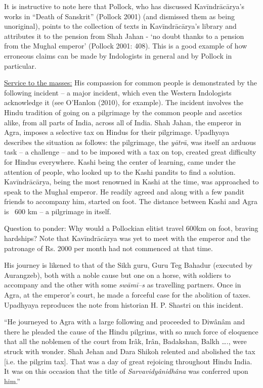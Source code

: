 \begin{enumerate}
 It is instructive to note here that Pollock, who has discussed Kavīndrācārya’s works in “Death of Sanskrit” (Pollock 2001) (and dismissed them as being unoriginal), points to the collection of texts in Kavīndrācārya’s library and attributes it to the pension from Shah Jahan - ‘no doubt thanks to a pension from the Mughal emperor’ (Pollock 2001: 408). This is a good example of how erroneous claims can be made by Indologists in general and by Pollock in particular.

 \underline{Service to the masses:} His compassion for common people is demonstrated by the following incident – a major incident, which even the Western Indologists acknowledge it (see O’Hanlon (2010), for example). The incident involves the Hindu tradition of going on a pilgrimage by the common people and ascetics alike, from all parts of India, across all of India. Shah Jahan, the emperor in Agra, imposes a selective tax on Hindus for their pilgrimage. Upadhyaya describes the situation as follows: the pilgrimage, the \textit{yātrā}, was itself an arduous task – a challenge – and to be imposed with a tax on top, created great difficulty for Hindus everywhere. Kashi being the center of learning, came under the attention of people, who looked up to the Kashi pandits to find a solution. Kavīndrācārya, being the most renowned in Kashi at the time, was approached to speak to the Mughal emperor. He readily agreed and along with a few pandit friends to accompany him, started on foot. The distance between Kashi and Agra is ~600 km – a pilgrimage in itself.

 Question to ponder: Why would a Pollockian elitist travel 600km on foot, braving hardships? Note that Kavīndrācārya was yet to meet with the emperor and the patronage of Rs. 2000 per month had not commenced at that time.

 His journey is likened to that of the Sikh guru, Guru Teg Bahadur (executed by Aurangzeb), both with a noble cause but one on a horse, with soldiers to accompany and the other with some \textit{swāmī--s} as travelling partners. Once in Agra, at the emperor’s court, he made a forceful case for the abolition of taxes. Upadhyaya reproduces the note from historian H. P. Shastri on this incident.

\begin{myquote}
“He journeyed to Agra with a large following and proceeded to Diwânâm and there he pleaded the cause of the Hindu pilgrims, with so much force of eloquence that all the noblemen of the court from Irâk, Irân, Badakshan, Balkh …., were struck with wonder. Shah Jehan and Dara Shikoh relented and abolished the tax [i.e. the pilgrim tax]. That was a day of great rejoicing throughout Hindu India. It was on this occasion that the title of \textit{Sarvavidyânidhâna} was conferred upon him.” 


\end{myquote}
\end{enumerate}
